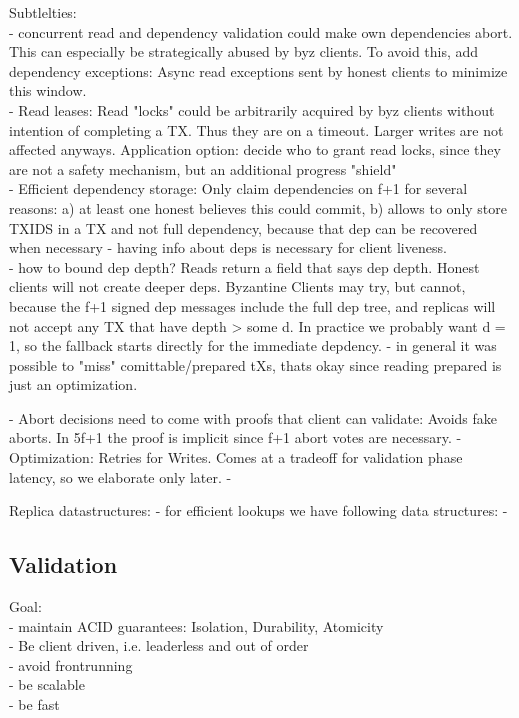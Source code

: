 Subtlelties:\\
- concurrent read and dependency validation could make own dependencies abort. This can especially be strategically abused by byz clients. To avoid this, add dependency exceptions: Async read exceptions sent by honest clients to minimize this window.\\
- Read leases: Read "locks" could be arbitrarily acquired by byz clients without intention of completing a TX. Thus they are on a timeout. Larger writes are not affected anyways. Application option: decide who to grant read locks, since they are not a safety mechanism, but an additional progress "shield"\\
- Efficient dependency storage: Only claim dependencies on f+1 for several reasons: a) at least one honest believes this could commit, b) allows to only store TXIDS in a TX and not full dependency, because that dep can be recovered when necessary - having info about deps is necessary for client liveness.\\

- how to bound dep depth? Reads return a field that says dep depth. Honest clients will not create deeper deps. Byzantine Clients may try, but cannot, because the f+1 signed dep messages include the full dep tree, and replicas will not accept any TX that have depth > some d. In practice we probably want d = 1, so the fallback starts directly for the immediate depdency.
	- in general it was possible to "miss" comittable/prepared tXs, thats okay since reading prepared is just an optimization.
	
- Abort decisions need to come with proofs that client can validate: Avoids fake aborts. In 5f+1 the proof is implicit since f+1 abort votes are necessary.
- Optimization: Retries for Writes. Comes at a tradeoff for validation phase latency, so we elaborate only later.
-
	
Replica datastructures:
- for efficient lookups we have following data structures:
- 


\subsection{Validation}
Goal:\\
- maintain ACID guarantees: Isolation, Durability, Atomicity\\
- Be client driven, i.e. leaderless and out of order\\
- avoid frontrunning\\
- be scalable\\
- be fast\\


